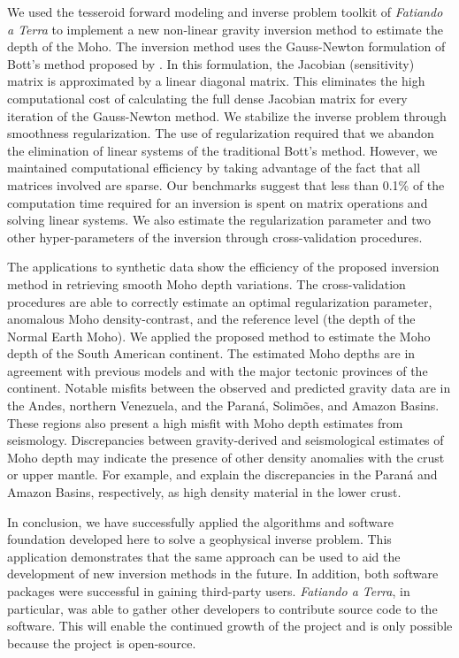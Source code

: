 We used the tesseroid forward modeling and inverse problem toolkit of
\textit{Fatiando a Terra} to implement a new non-linear gravity inversion
method to estimate the depth of the Moho.
The inversion method uses the Gauss-Newton formulation of Bott's method
proposed by \citet{silva2014}.
In this formulation, the Jacobian (sensitivity) matrix is approximated by a
linear diagonal matrix.
This eliminates the high computational cost of calculating the full dense
Jacobian matrix for every iteration of the Gauss-Newton method.
We stabilize the inverse problem through smoothness regularization.
The use of regularization required that we abandon the elimination of linear
systems of the traditional Bott's method.
However, we maintained computational efficiency by taking advantage of the fact
that all matrices involved are sparse.
Our benchmarks suggest that less than 0.1\% of the computation time required
for an inversion is spent on matrix operations and solving linear systems.
We also estimate the regularization parameter and two other hyper-parameters of
the inversion through cross-validation procedures.

The applications to synthetic data show the
efficiency of the proposed inversion method in retrieving smooth Moho depth
variations.
The cross-validation procedures are able to correctly estimate an optimal
regularization parameter, anomalous Moho density-contrast, and the reference
level (the depth of the Normal Earth Moho).
We applied the proposed method to estimate the Moho depth of the South American
continent.
The estimated Moho depths are in agreement with previous models and with the
major tectonic provinces of the continent.
Notable misfits between the observed and predicted gravity data are in the
Andes, northern Venezuela, and the Paraná, Solimões, and Amazon Basins.
These regions also present a high misfit with Moho depth estimates from
seismology.
Discrepancies between gravity-derived and seismological estimates of Moho depth
may indicate the presence of other density anomalies with the crust or upper
mantle.
For example, \citet{mariani2013} and \citet{nunn1988} explain the discrepancies
in the Paraná and Amazon Basins, respectively, as high density material in the
lower crust.

In conclusion,
we have successfully applied the algorithms and software foundation developed
here to solve a geophysical inverse problem.
This application demonstrates that the same approach can be used to aid the
development of new inversion methods in the future.
In addition, both software packages were successful in gaining third-party
users.
\textit{Fatiando a Terra}, in particular, was able to gather other developers
to contribute source code to the software.
This will enable the continued growth of the project and is only possible
because the project is open-source.
